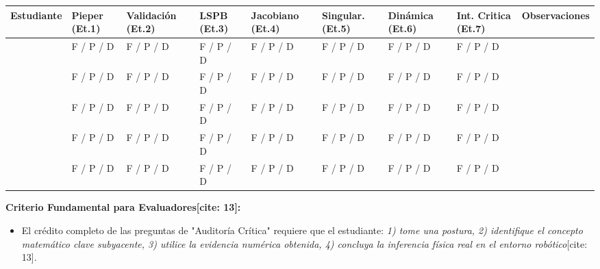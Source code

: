 \documentclass[11pt, a4paper, landscape]{article}
\begin{document}
\vspace{0.4cm}
{\small
\renewcommand{\arraystretch}{1.5}
\noindent
\begin{tabularx}{\textwidth}{|>{\hsize=1.2\hsize\raggedright\arraybackslash}X|>{\hsize=0.8\hsize\centering\arraybackslash}X|>{\hsize=0.8\hsize\centering\arraybackslash}X|>{\hsize=0.8\hsize\centering\arraybackslash}X|>{\hsize=0.8\hsize\centering\arraybackslash}X|>{\hsize=0.8\hsize\centering\arraybackslash}X|>{\hsize=0.8\hsize\centering\arraybackslash}X|>{\hsize=0.8\hsize\centering\arraybackslash}X|>{\hsize=1\hsize\raggedright\arraybackslash}X|}
\hline
\rowcolor{gray!20} \textbf{Estudiante} & \textbf{Pieper} (Et.1) & \textbf{Validación} (Et.2) & \textbf{LSPB} (Et.3) & \textbf{Jacobiano} (Et.4) & \textbf{Singular.} (Et.5) & \textbf{Dinámica} (Et.6) & \textbf{Int. Critica} (Et.7) & \textbf{Observaciones} \\ \hline
& F / P / D & F / P / D & F / P / D & F / P / D & F / P / D & F / P / D & F / P / D & \\ \hline
& F / P / D & F / P / D & F / P / D & F / P / D & F / P / D & F / P / D & F / P / D & \\ \hline
& F / P / D & F / P / D & F / P / D & F / P / D & F / P / D & F / P / D & F / P / D & \\ \hline
& F / P / D & F / P / D & F / P / D & F / P / D & F / P / D & F / P / D & F / P / D & \\ \hline
& F / P / D & F / P / D & F / P / D & F / P / D & F / P / D & F / P / D & F / P / D & \\ \hline
\end{tabularx}
}

\vspace{0.6cm}
\textbf{Criterio Fundamental para Evaluadores[cite: 13]:}
\begin{itemize}
    \item El crédito completo de las preguntas de "Auditoría Crítica" requiere que el estudiante: \textit{1) tome una postura, 2) identifique el concepto matemático clave subyacente, 3) utilice la evidencia numérica obtenida, 4) concluya la inferencia física real en el entorno robótico}[cite: 13].
\end{itemize}
\end{document}
